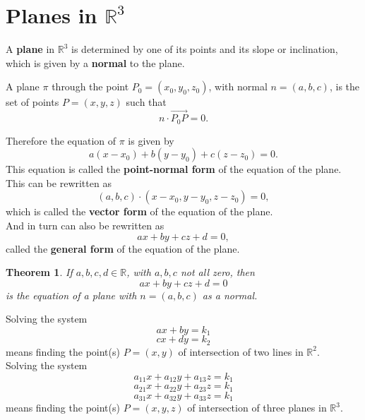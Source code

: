 \documentclass[a4paper, 12pt]{article}
\newtheorem{theorem}{Theorem}[section]
\newenvironment{definition}[1][Definition]{\begin{trivlist}
\item[\hskip \labelsep {\bfseries #1}]}{\end{trivlist}}
\newenvironment{remark}[1][Remark]{\begin{trivlist}
\item[\hskip \labelsep {\bfseries #1}]}{\end{trivlist}}
\newcommand{\keyword}[1]{\textbf{#1}}
\begin{document}
    \section{Planes in $\mathbb{R}^3$}
        A \keyword{plane} in $\mathbb{R}^3$ is determined by one of its
        points and its slope or inclination, which is given by a \keyword{normal} to the plane.
        \begin{definition}
            A plane $\pi$ through the point $P_0 = (x_0, y_0, z_0)$, with normal
            $n = (a, b, c)$, is the set of points $P = (x, y, z)$ such that
            \[
                n \cdot \overrightarrow{P_0P} = 0.
            \]
        \end{definition}
        Therefore the equation of $\pi$ is given by
        \[
            a(x - x_0) + b(y - y_0) + c(z - z_0) = 0.
        \]
        This equation is called the \keyword{point-normal form} of the equation of
        the plane.\\
        This can be rewritten as
        \begin{equation*}
            (a, b, c) \cdot (x - x_0, y - y_0, z - z_0) = 0,
        \end{equation*}
        which is called the \keyword{vector form} of the equation of the plane.\\
        And in turn can also be rewritten as
        \begin{equation*}
            ax + by + cz + d = 0,
        \end{equation*}
        called the \keyword{general form} of the equation of the plane.
        \begin{theorem}
            If $a, b, c, d \in \mathbb{R}$, with $a, b, c$ not all zero, then
            \begin{equation*}
                ax + by + cz + d = 0
            \end{equation*}
            is the equation of a plane with $n = (a, b, c)$ as a normal.
        \end{theorem}
        \begin{remark}
            Solving the system
            \[ax + by = k_1\]
            \[cx + dy = k_2\]
            means finding the point(s) $P = (x, y)$ of intersection of two lines
            in $\mathbb{R}^2$.\\
            Solving the system
            \[a_{11}x + a_{12}y + a_{13}z = k_1\]
            \[a_{21}x + a_{22}y + a_{23}z = k_1\]
            \[a_{31}x + a_{32}y + a_{33}z = k_1\]
            means finding the point(s) $P = (x, y, z)$ of intersection of three
            planes in $\mathbb{R}^3$.
        \end{remark}
\end{document}

